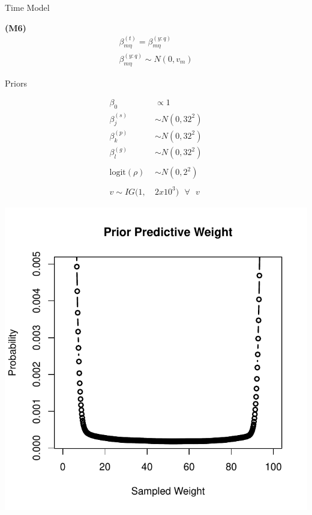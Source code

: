 \documentclass[ xcolor = pdftex, dvipsnames, table ]{beamer}
\begin{document}
\begin{frame}{Time Model}
\begin{minipage}{0.3\textwidth}
\begin{center}
\textbf{(M6)}
\begin{eqnarray*}
&\beta^{(t)}_{m\eta} = \beta^{(y:q)}_{m\eta}&\\
&\beta^{(y:q)}_{m\eta} \sim N(0, v_m)&
\end{eqnarray*}
\end{center}
\end{minipage}
\end{frame}

%
%

\begin{frame}{Priors}
$~$
\hspace{-0.8cm}
\begin{minipage}{0.55\textwidth}
\begin{align*}
\beta_0 &\propto 1\\
\beta^{(s)}_j &\sim N(0, 32^2)\\
\beta^{(p)}_k &\sim N(0, 32^2)\\
\beta^{(g)}_l &\sim N(0, 32^2)\\
&\\
\text{logit}(\rho) &\sim N(0, 2^2)\\
&\\
v\sim IG(1,~&2x10^{3}) ~~~\forall~~~v 
\end{align*}
\end{minipage}
\begin{minipage}{0.4\textwidth}       
\includegraphics[width=1.4\textwidth]{../pictures/priorPredict.pdf}
\end{minipage}
\end{frame}
\end{document}
